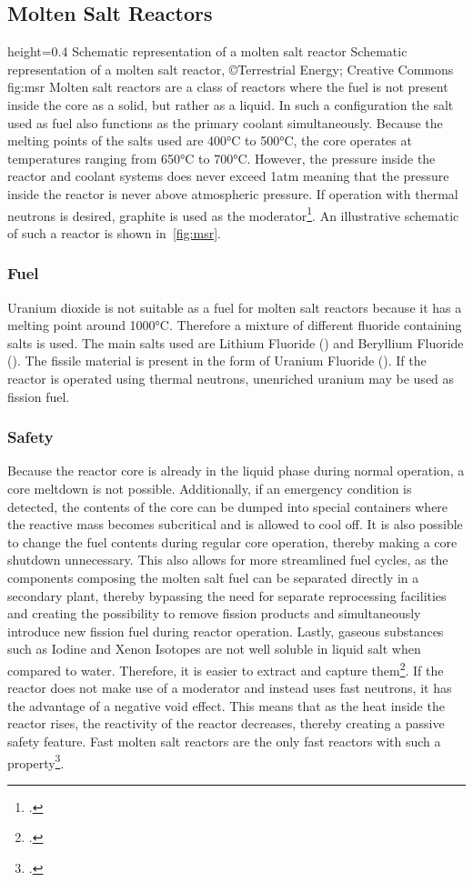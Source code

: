 \subsection{Molten Salt Reactors}
    {height=0.4\textheight}
    {Schematic representation of a molten salt reactor}
    {Schematic representation of a molten salt reactor, ©Terrestrial Energy; Creative Commons}
    {fig:msr}
Molten salt reactors are a class of reactors where the fuel is not present inside the core as a solid,
but rather as a liquid. In such a configuration the salt used as fuel also functions as the primary coolant
simultaneously. Because the melting points of the salts used are 400°C to 500°C, the core operates at temperatures
ranging from 650°C to 700°C. However, the pressure inside the reactor and coolant systems does never
exceed 1atm meaning that the pressure inside the reactor is never above atmospheric pressure.
If operation with thermal neutrons is desired, graphite is used as the moderator\footcite[147-152]{T4Gen}.
An illustrative schematic of such a reactor is shown in~\ref{fig:msr}.
\subsubsection{Fuel}
Uranium dioxide is not suitable as a fuel for molten salt reactors because it has a melting point around
1000°C. Therefore a mixture of different fluoride containing salts is used. The main salts used are
Lithium Fluoride () and Beryllium Fluoride (). The fissile material is present in the
form of Uranium Fluoride (). If the reactor is operated using thermal neutrons, unenriched
uranium may be used as fission fuel.
\subsubsection{Safety}
Because the reactor core is already in the liquid phase during normal operation, a core meltdown is not
possible. Additionally, if an emergency condition is detected, the contents of the core can be dumped
into special containers where the reactive mass becomes subcritical and is allowed to cool off.
It is also possible to change the fuel contents during regular core operation, thereby making a core
shutdown unnecessary. This also allows for more streamlined fuel cycles, as the components composing
the molten salt fuel can be separated directly in a secondary plant, thereby bypassing the need for
separate reprocessing facilities and creating the possibility to remove fission products and simultaneously
introduce new fission fuel during reactor operation. Lastly, gaseous substances such as Iodine
and Xenon Isotopes are not well soluble in liquid salt when compared to water. Therefore,
it is easier to extract and capture them\footcite{msrs}. If the reactor does not make use
of a moderator and instead uses fast neutrons, it has the advantage of a negative void effect. This
means that as the heat inside the reactor rises, the reactivity of the reactor decreases, thereby
creating a passive safety feature. Fast molten salt reactors are the only fast reactors with such a
property\footcite[164]{T4Gen}.
